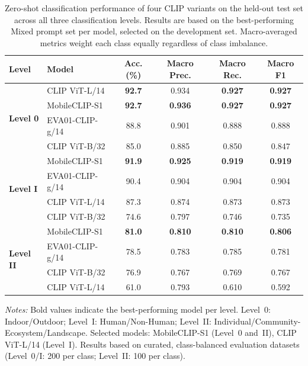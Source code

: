 \documentclass[hidelinks, 11pt]{article}
\begin{document}
\begin{table}[h]
\centering
\caption{Zero-shot classification performance of four CLIP variants on the
held-out test set across all three classification levels. Results are based
on the best-performing Mixed prompt set per model, selected on the development
set. Macro-averaged metrics weight each class equally regardless of class
imbalance.}
\label{tab:model_comparison_all}
\begin{tabular}{llcccc}
\hline
\textbf{Level} & \textbf{Model} & \textbf{Acc. (\%)} & \textbf{Macro Prec.} & \textbf{Macro Rec.} & \textbf{Macro F1} \\
\hline
\multirow{4}{*}{\textbf{Level 0}}
    & CLIP ViT-L/14   & \textbf{92.7} & 0.934          & \textbf{0.927} & \textbf{0.927} \\
    & MobileCLIP-S1   & \textbf{92.7} & \textbf{0.936} & \textbf{0.927} & \textbf{0.927} \\
    & EVA01-CLIP-g/14 & 88.8          & 0.901          & 0.888          & 0.888          \\
    & CLIP ViT-B/32   & 85.0          & 0.885          & 0.850          & 0.847          \\
\hline
\multirow{4}{*}{\textbf{Level I}}
    & MobileCLIP-S1   & \textbf{91.9} & \textbf{0.925} & \textbf{0.919} & \textbf{0.919} \\
    & EVA01-CLIP-g/14 & 90.4          & 0.904          & 0.904          & 0.904          \\
    & CLIP ViT-L/14   & 87.3          & 0.874          & 0.873          & 0.873          \\
    & CLIP ViT-B/32   & 74.6          & 0.797          & 0.746          & 0.735          \\
\hline
\multirow{4}{*}{\textbf{Level II}}
    & MobileCLIP-S1   & \textbf{81.0} & \textbf{0.810} & \textbf{0.810} & \textbf{0.806} \\
    & EVA01-CLIP-g/14 & 78.5          & 0.783          & 0.785          & 0.781          \\
    & CLIP ViT-B/32   & 76.9          & 0.767          & 0.769          & 0.767          \\
    & CLIP ViT-L/14   & 61.0          & 0.793          & 0.610          & 0.592          \\
\hline
\end{tabular}
\begin{minipage}{\textwidth}
\bigskip\raggedright\small
\textit{Notes:} Bold values indicate the best-performing model per level.
Level~0: Indoor/Outdoor; Level~I: Human/Non-Human; Level~II:
Individual/Community-Ecosystem/Landscape. Selected models: MobileCLIP-S1
(Level~0 and~II), CLIP ViT-L/14 (Level~I). Results based on curated,
class-balanced evaluation datasets (Level~0/I: 200 per class;
Level~II: 100 per class).
\end{minipage}
\end{table}
\end{document}
